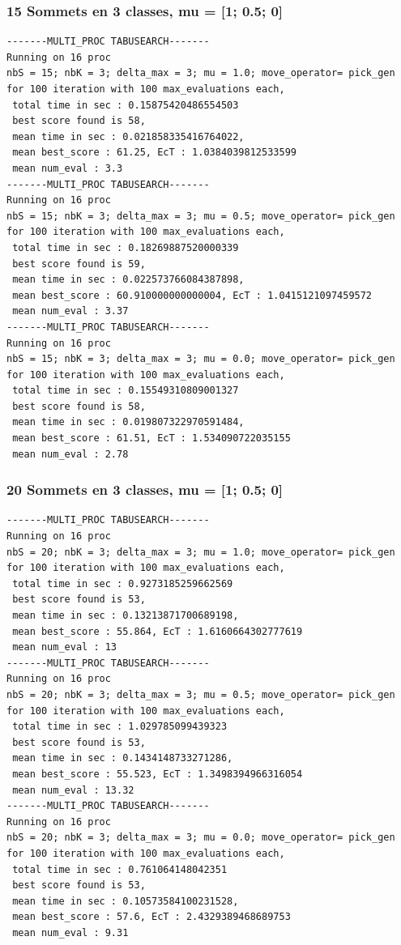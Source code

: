 \documentclass[a4paper]{article}
\begin{document}
\subsubsection{15 Sommets en 3 classes, mu = [1; 0.5; 0]}
\begin{verbatim}
-------MULTI_PROC TABUSEARCH-------
Running on 16 proc
nbS = 15; nbK = 3; delta_max = 3; mu = 1.0; move_operator= pick_gen
for 100 iteration with 100 max_evaluations each, 
 total time in sec : 0.15875420486554503
 best score found is 58,
 mean time in sec : 0.021858335416764022,
 mean best_score : 61.25, EcT : 1.0384039812533599
 mean num_eval : 3.3
-------MULTI_PROC TABUSEARCH-------
Running on 16 proc
nbS = 15; nbK = 3; delta_max = 3; mu = 0.5; move_operator= pick_gen
for 100 iteration with 100 max_evaluations each, 
 total time in sec : 0.18269887520000339
 best score found is 59,
 mean time in sec : 0.022573766084387898,
 mean best_score : 60.910000000000004, EcT : 1.0415121097459572
 mean num_eval : 3.37
-------MULTI_PROC TABUSEARCH-------
Running on 16 proc
nbS = 15; nbK = 3; delta_max = 3; mu = 0.0; move_operator= pick_gen
for 100 iteration with 100 max_evaluations each, 
 total time in sec : 0.15549310809001327
 best score found is 58,
 mean time in sec : 0.019807322970591484,
 mean best_score : 61.51, EcT : 1.534090722035155
 mean num_eval : 2.78
\end{verbatim}
\subsubsection{20 Sommets en 3 classes, mu = [1; 0.5; 0]}
\begin{verbatim}
-------MULTI_PROC TABUSEARCH-------
Running on 16 proc
nbS = 20; nbK = 3; delta_max = 3; mu = 1.0; move_operator= pick_gen
for 100 iteration with 100 max_evaluations each, 
 total time in sec : 0.9273185259662569
 best score found is 53,
 mean time in sec : 0.13213871700689198,
 mean best_score : 55.864, EcT : 1.6160664302777619
 mean num_eval : 13
-------MULTI_PROC TABUSEARCH-------
Running on 16 proc
nbS = 20; nbK = 3; delta_max = 3; mu = 0.5; move_operator= pick_gen
for 100 iteration with 100 max_evaluations each, 
 total time in sec : 1.029785099439323
 best score found is 53,
 mean time in sec : 0.1434148733271286,
 mean best_score : 55.523, EcT : 1.3498394966316054
 mean num_eval : 13.32
-------MULTI_PROC TABUSEARCH-------
Running on 16 proc
nbS = 20; nbK = 3; delta_max = 3; mu = 0.0; move_operator= pick_gen
for 100 iteration with 100 max_evaluations each, 
 total time in sec : 0.761064148042351
 best score found is 53,
 mean time in sec : 0.10573584100231528,
 mean best_score : 57.6, EcT : 2.4329389468689753
 mean num_eval : 9.31
\end{verbatim}
\end{document}
